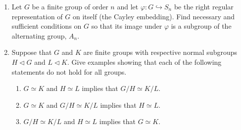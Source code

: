 \documentclass[12pt]{article}
\begin{document}
\begin{enumerate}
  
% 
\item Let $G$ be a finite group of order $n$ and let 
      $\varphi\colon G\hookrightarrow S_n$ be the right regular representation of $G$ on itself
      (the Cayley embedding).
      Find necessary and sufficient conditions on $G$ so that its image under $\varphi$ is a
      subgroup of the alternating group, $A_n$.
 
% 
\item Suppose that $G$ and $K$ are finite groups with respective normal subgroups
     $H\triangleleft G$ and $L\triangleleft K$. 
     Give examples showing that each of the following statements do not hold for all
     groups.
 \begin{enumerate}
  \item $G\simeq K$ and $H\simeq L$ implies that $G/H\simeq K/L$.
  \item $G\simeq K$ and $G/H\simeq K/L$ implies that $H\simeq L$.
  \item $G/H\simeq K/L$ and $H\simeq L$ implies that $G\simeq K$.
 \end{enumerate}





\end{enumerate}
\end{document}
